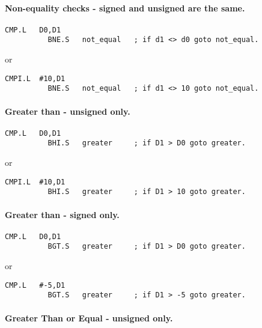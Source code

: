 \paragraph{Non-{}equality checks -{} signed and unsigned are the
          same.}

\begin{lstlisting}[firstnumber=1,]
          CMP.L   D0,D1
          BNE.S   not_equal   ; if d1 <> d0 goto not_equal.
\end{lstlisting}

or

\begin{lstlisting}[firstnumber=1,]
          CMPI.L  #10,D1
          BNE.S   not_equal   ; if d1 <> 10 goto not_equal.
\end{lstlisting}

\paragraph{Greater than -{} unsigned only.}

\begin{lstlisting}[firstnumber=1,]
          CMP.L   D0,D1
          BHI.S   greater     ; if D1 > D0 goto greater.
\end{lstlisting}

or

\begin{lstlisting}[firstnumber=1,]
          CMPI.L  #10,D1
          BHI.S   greater     ; if D1 > 10 goto greater.
\end{lstlisting}

\paragraph{Greater than -{} signed only.}

\begin{lstlisting}[firstnumber=1,]
          CMP.L   D0,D1
          BGT.S   greater     ; if D1 > D0 goto greater.
\end{lstlisting}

or

\begin{lstlisting}[firstnumber=1,]
          CMP.L   #-5,D1
          BGT.S   greater     ; if D1 > -5 goto greater.
\end{lstlisting}

\paragraph{Greater Than or Equal -{} unsigned only.}

